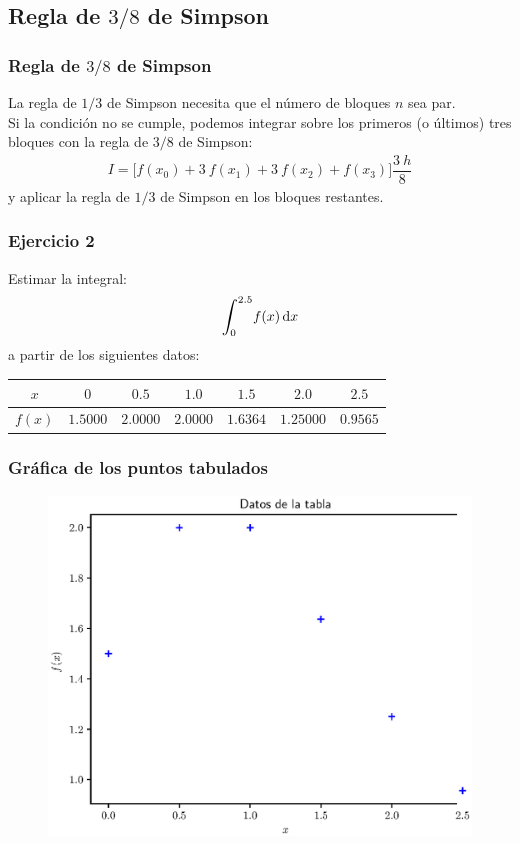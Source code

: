 \documentclass[12pt]{beamer}
\begin{document}
\subsection{Regla de \texorpdfstring{$3/8$}{3/8} de Simpson}

\begin{frame}
\frametitle{Regla de $3/8$ de Simpson}
La regla de $1/3$ de Simpson necesita que el número de bloques $n$ sea par.
\\
\bigskip
\pause
Si la condición no se cumple, podemos integrar sobre los primeros (o últimos) tres bloques con la regla de $3/8$ de Simpson:
\pause
\begin{align*}
I = \bigg[ f (x_{0}) + 3 \: f (x_{1}) + 3 \: f (x_{2}) + f (x_{3}) \bigg] \dfrac{3 \: h}{8}
\end{align*}
y aplicar la regla de $1/3$ de Simpson en los bloques restantes.
\end{frame}
\begin{frame}
\frametitle{Ejercicio 2}
Estimar la integral:
\begin{align*}
\scaleint{6ex}_{\bs 0}^{2.5} f (x) \dd{x}
\end{align*}
a partir de los siguientes datos:
\pause
\fontsize{12}{12}\selectfont
\begin{center}
\begin{tabular}{c | c | c | c | c | c | c}
\hline
$x$ & $0$ & $0.5$ & $1.0$ & $1.5$ & $2.0$ & $2.5$ \\ \hline
$f (x)$ & $1.5000$ & $2.0000$ & $2.0000$ & $1.6364$ & $1.25000$ & $0.9565$ \\ \hline
\end{tabular}
\end{center}
\end{frame}
\begin{frame}
\frametitle{Gráfica de los puntos tabulados}
\begin{figure}
	\centering
	\includegraphics[scale=0.55]{Imagenes/integracion_ejercicio_puntos_01.eps}
\end{figure}
\end{frame}
\end{document}
